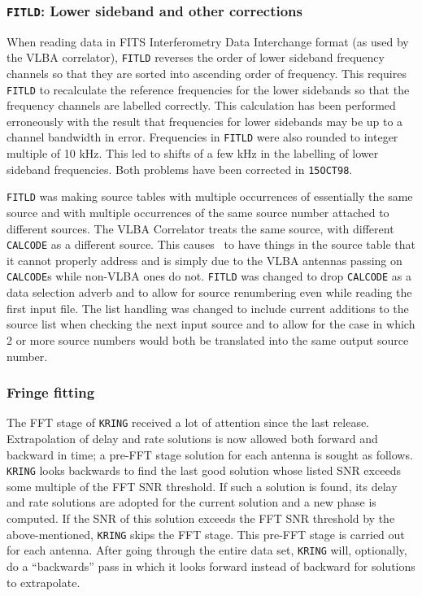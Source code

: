 \subsubsection{{\tt FITLD}: Lower sideband and other corrections}

When reading data in FITS Interferometry Data Interchange format (as
used by the VLBA correlator), {\tt FITLD} reverses the order of lower
sideband frequency channels so that they are sorted into ascending
order of frequency.  This requires {\tt FITLD} to recalculate the
reference frequencies for the lower sidebands so that the frequency
channels are labelled correctly.  This calculation has been performed
erroneously with the result that frequencies for lower sidebands may
be up to a channel bandwidth in error.  Frequencies in {\tt FITLD}
were also rounded to integer multiple of 10 kHz.  This led to shifts
of a few kHz in the labelling of lower sideband frequencies.  Both
problems have been corrected in \hbox{{\tt15OCT98}}.

{\tt FITLD} was making source tables with multiple occurrences of
essentially the same source and with multiple occurrences of the same
source number attached to different sources.  The VLBA Correlator
treats the same source, with different {\tt CALCODE} as a different
source.  This causes \AIPS\ to have things in the source table that it
cannot properly address and is simply due to the VLBA antennas passing
on {\tt CALCODE}s while non-VLBA ones do not.  {\tt FITLD} was changed
to drop {\tt CALCODE} as a data selection adverb and to allow for
source renumbering even while reading the first input file.  The list
handling was changed to include current additions to the source list
when checking the next input source and to allow for the case in which
2 or more source numbers would both be translated into the same output
source number.

\subsubsection{Fringe fitting}

The FFT stage of {\tt KRING} received a lot of attention since the
last release.  Extrapolation of delay and rate solutions is now
allowed both forward and backward in time; a pre-FFT stage solution
for each antenna is sought as follows.  {\tt KRING} looks backwards to
find the last good solution whose listed SNR exceeds some multiple of
the FFT SNR threshold.  If such a solution is found, its delay and
rate solutions are adopted for the current solution and a new phase is
computed.  If the SNR of this solution exceeds the FFT SNR threshold
by the above-mentioned, {\tt KRING} skips the FFT stage.  This pre-FFT
stage is carried out for each antenna.  After going through the entire
data set, {\tt KRING} will, optionally, do a ``backwards'' pass in
which it looks forward instead of backward for solutions to
extrapolate.

